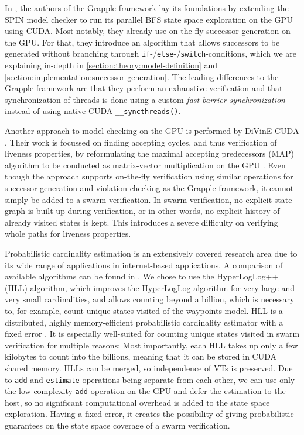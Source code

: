 \documentclass[
fancyheadings, %
%
%
]{stsreprt}
\begin{document}
In \cite{Bartocci2014.GPGPU-Parallel-SPIN}, the authors of the Grapple framework lay its foundations by extending the SPIN model checker to run its parallel BFS state space exploration \cite{Holzmann2012.Paralellizing-SPIN} on the GPU using CUDA.
Most notably, they already use on-the-fly successor generation on the GPU.
For that, they introduce an algorithm that allows successors to be generated without branching through \texttt{if}-/\texttt{else}-/\texttt{switch}-conditions, which we are explaining in-depth in \cref{section:theory:model-definition} and \cref{section:implementation:successor-generation}.
The leading differences to the Grapple framework are that they perform an exhaustive verification and that synchronization of threads is done using a custom \emph{fast-barrier synchronization} instead of using native CUDA \texttt{\_\_syncthreads()}.

Another approach to model checking on the GPU is performed by DiVinE-CUDA \cite{Barnat2009.DiVinE-CUDA}.
Their work is focussed on finding accepting cycles, and thus verification of liveness properties, by reformulating the maximal accepting predecessors (MAP) algorithm to be conducted as matrix-vector multiplication on the GPU \cite{Barnat2009}.
Even though the approach supports on-the-fly verification using similar operations for successor generation and violation checking as the Grapple framework, it cannot simply be added to a swarm verification.
In swarm verification, no explicit state graph is built up during verification, or in other words, no explicit history of already visited states is kept.
This introduces a severe difficulty on verifying whole paths for liveness properties.


Probabilistic cardinality estimation is an extensively covered research area due to its wide range of applications in internet-based applications.
A comparison of available algorithms can be found in \cite{Metwally2008}.
We chose to use the HyperLogLog++ (HLL) algorithm, which improves the HyperLogLog algorithm \cite{Flajolet2007.HyperLogLog} for very large and very small cardinalities, and allows counting beyond a billion, which is necessary to, for example, count unique states visited of the waypoints model.
HLL is a distributed, highly memory-efficient probabilistic cardinality estimator with a fixed error \cite{Heule2013.HyperLogLog++}.
It is especially well-suited for counting unique states visited in swarm verification for multiple reasons:
Most importantly, each HLL takes up only a few kilobytes to count into the billions, meaning that it can be stored in CUDA shared memory.
HLLs can be merged, so independence of VTs is preserved.
Due to \texttt{add} and \texttt{estimate} operations being separate from each other, we can use only the low-complexity \texttt{add} operation on the GPU and defer the estimation to the host, so no significant computational overhead is added to the state space exploration.
Having a fixed error, it creates the possibility of giving probabilistic guarantees on the state space coverage of a swarm verification.
\end{document}
